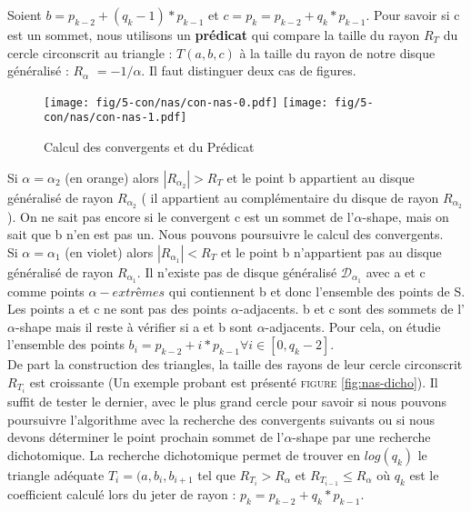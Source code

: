 Soient  $b = p_{k-2} + (q_k - 1) * p_{k-1}$ et $c = p_k = p_{k-2} + q_k * p_{k-1}$. Pour savoir si c est un sommet, nous utilisons un \textbf{prédicat} qui compare la taille du rayon \textbf{$R_T$} du cercle circonscrit au triangle : $T(a, b, c)$ à la taille du rayon de notre disque généralisé : \textbf{$R_{\alpha}$} $= -1/\alpha$. Il faut distinguer deux cas de figures.\\

\begin{figure}[H]
  \centering
  \texttt{[image: fig/5-con/nas/con-nas-0.pdf]}
  \texttt{[image: fig/5-con/nas/con-nas-1.pdf]}
  \caption{Calcul des convergents et du Prédicat}
  \label{fig:nas1}
\end{figure}

Si $\alpha = \alpha_{2}$ (en orange) alors \textbf{$|R_{\alpha_{2}}| > R_T$} et le point b appartient au disque généralisé de rayon $R_{\alpha_{2}}$ ( il appartient au complémentaire du disque de rayon $R_{\alpha_{2}}$). On ne sait pas encore si le convergent c est un sommet de l'$\alpha$-shape, mais on sait que b n'en est pas un. Nous pouvons poursuivre le calcul des convergents.\\

Si $\alpha = \alpha_{1}$ (en violet) alors \textbf{$|R_{\alpha_{1}}| < R_T$} et le point b n'appartient pas au disque généralisé de rayon $R_{\alpha_{1}}$. Il n'existe pas de disque généralisé $\mathcal{D}_{\alpha_1}$ avec a et c comme points $\alpha-extrêmes$ qui contiennent b et donc l'ensemble des points de S. Les points a et c ne sont pas des points $\alpha$-adjacents. b et c sont des sommets de l'$\alpha$-shape mais il reste à vérifier si a et b sont $\alpha$-adjacents. Pour cela, on étudie l'ensemble des points  $b_i = p_{k-2} + i*p_{k-1} \forall i \in [0, q_k-2]$.\\

De part la construction des triangles, la taille des rayons de leur cercle circonscrit $R_{T_{i}}$ est croissante (Un exemple probant est présenté \textsc{figure} \ref{fig:nas-dicho}). Il suffit de tester le dernier, avec le plus grand cercle pour savoir si nous pouvons poursuivre l'algorithme avec la recherche des convergents suivants ou si nous devons déterminer le point prochain sommet de l'$\alpha$-shape par une recherche dichotomique. La recherche dichotomique permet de trouver en $log(q_k)$ le triangle adéquate $T_i = (a, b_{i}, b_{i+1}$ tel que $R_{T_i} > R_{\alpha}$ et $R_{T_{i-1}} \leq R_{\alpha}$ où $q_k$ est le coefficient calculé lors du jeter de rayon : $p_k = p_{k-2} + q_k * p_{k-1}$.

